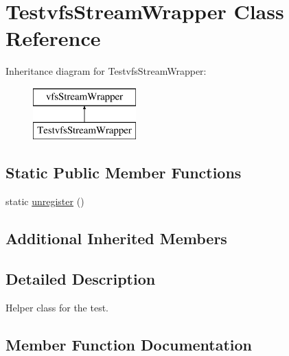 \hypertarget{classorg_1_1bovigo_1_1vfs_1_1_testvfs_stream_wrapper}{}\section{Testvfs\+Stream\+Wrapper Class Reference}
\label{classorg_1_1bovigo_1_1vfs_1_1_testvfs_stream_wrapper}
Inheritance diagram for Testvfs\+Stream\+Wrapper\+:\begin{figure}[H]
\begin{center}
\leavevmode
\includegraphics[height=2.000000cm]{classorg_1_1bovigo_1_1vfs_1_1_testvfs_stream_wrapper}
\end{center}
\end{figure}
\subsection*{Static Public Member Functions}
\begin{DoxyCompactItemize}
\item 
static \mbox{\hyperlink{classorg_1_1bovigo_1_1vfs_1_1_testvfs_stream_wrapper_a4adcc093546b265f1ace78ceb3c350a1}{unregister}} ()
\end{DoxyCompactItemize}
\subsection*{Additional Inherited Members}


\subsection{Detailed Description}
Helper class for the test. 

\subsection{Member Function Documentation}
\mbox{\label{classorg_1_1bovigo_1_1vfs_1_1_testvfs_stream_wrapper_a4adcc093546b265f1ace78ceb3c350a1}} 

